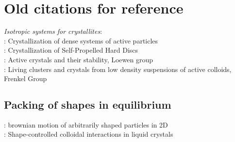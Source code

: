 \section{Old citations for reference}

\textit{Isotropic systems for crystallites}: \\
\cite{BialkeEA_2012_PRL}: Crystallization of dense systems of active particles \\
\cite{BriandDauchot_2016_PRL}: Crystallization of Self-Propelled Hard Discs\\
\cite{MenzelEA_2014_PRE}: Active crystals and their stability, Loewen group \\
\cite{MognettiEA_2013_PRL}: Living clusters and crystals from low density suspensions of active colloids, Frenkel Group \\

\subsection{Packing of shapes in equilibrium}
\cite{Chakrabarty_2014_Langmuir}: brownian motion of arbitrarily shaped particles in 2D \\
\cite{LapointeMasonSmalyukh_2009_Science}: Shape-controlled colloidal interactions in liquid crystals \\